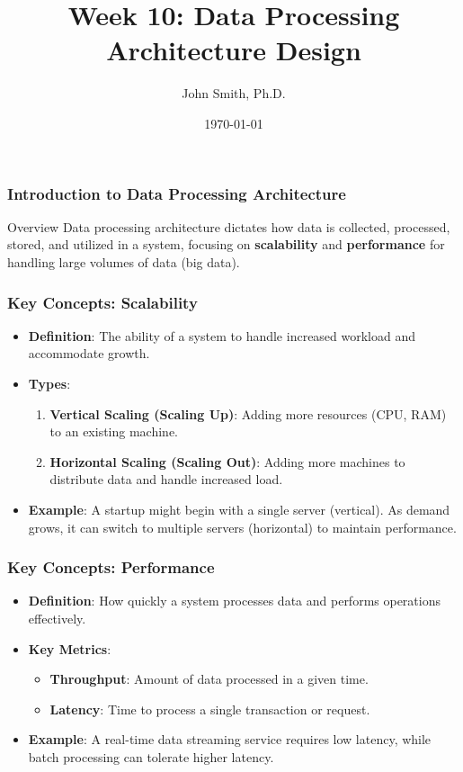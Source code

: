 \documentclass[aspectratio=169]{beamer}
\title[Week 10: Data Processing Architecture Design]{Week 10: Data Processing Architecture Design}
\author[John Smith]{John Smith, Ph.D.}
\institute[University Name]{
  Department of Computer Science\\
  University Name\\
  Email: email@university.edu\\
  Website: www.university.edu
}
\date{\today}
\begin{document}
\frame{\titlepage}

\begin{frame}[fragile]
    \frametitle{Introduction to Data Processing Architecture}
    \begin{block}{Overview}
        Data processing architecture dictates how data is collected, processed, stored, and utilized in a system, focusing on \textbf{scalability} and \textbf{performance} for handling large volumes of data (big data).
    \end{block}
\end{frame}

\begin{frame}[fragile]
    \frametitle{Key Concepts: Scalability}
    \begin{itemize}
        \item \textbf{Definition}: The ability of a system to handle increased workload and accommodate growth.
        \item \textbf{Types}:
        \begin{enumerate}
            \item \textbf{Vertical Scaling (Scaling Up)}: Adding more resources (CPU, RAM) to an existing machine.
            \item \textbf{Horizontal Scaling (Scaling Out)}: Adding more machines to distribute data and handle increased load.
        \end{enumerate}
        \item \textbf{Example}: A startup might begin with a single server (vertical). As demand grows, it can switch to multiple servers (horizontal) to maintain performance.
    \end{itemize}
\end{frame}

\begin{frame}[fragile]
    \frametitle{Key Concepts: Performance}
    \begin{itemize}
        \item \textbf{Definition}: How quickly a system processes data and performs operations effectively.
        \item \textbf{Key Metrics}:
        \begin{itemize}
            \item \textbf{Throughput}: Amount of data processed in a given time.
            \item \textbf{Latency}: Time to process a single transaction or request.
        \end{itemize}
        \item \textbf{Example}: A real-time data streaming service requires low latency, while batch processing can tolerate higher latency.
    \end{itemize}
\end{frame}
\end{document}
